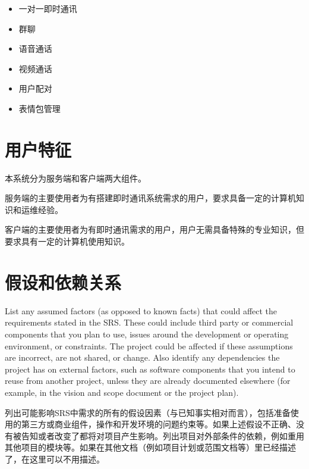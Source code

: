 


\begin{itemize}
	\item 一对一即时通讯
	\item 群聊
	\item 语音通话
	\item 视频通话
	\item 用户配对
	\item 表情包管理
	\end{itemize}

\section{用户特征}
%
%

本系统分为服务端和客户端两大组件。

服务端的主要使用者为有搭建即时通讯系统需求的用户，要求具备一定的计算机知识和运维经验。

客户端的主要使用者为有即时通讯需求的用户，用户无需具备特殊的专业知识，但要求具有一定的计算机使用知识。

\section{假设和依赖关系}
List any assumed factors (as opposed to known facts) that could affect the requirements stated in the SRS. These could include third party or commercial components that you plan to use, issues around the development or operating environment, or constraints. The project could be affected if these assumptions are incorrect, are not shared, or change. Also identify any dependencies the project has on external factors, such as software components that you intend to reuse from another project, unless they are already documented elsewhere (for example, in the vision and scope document or the project plan). 

列出可能影响SRS中需求的所有的假设因素（与已知事实相对而言），包括准备使用的第三方或商业组件，操作和开发环境的问题约束等。如果上述假设不正确、没有被告知或者改变了都将对项目产生影响。列出项目对外部条件的依赖，例如重用其他项目的模块等。如果在其他文档（例如项目计划或范围文档等）里已经描述了，在这里可以不用描述。
